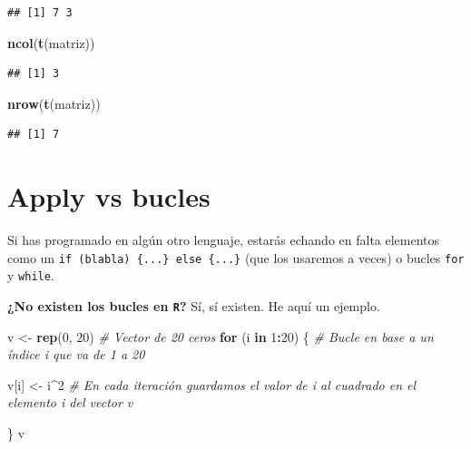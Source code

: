 \documentclass[11pt,]{book}
\newenvironment{Shaded}{\begin{snugshade}}{\end{snugshade}}
\newcommand{\CommentTok}[1]{\textcolor[rgb]{0.37,0.37,0.37}{\textit{#1}}}
\newcommand{\ControlFlowTok}[1]{\textcolor[rgb]{0.27,0.27,0.27}{\textbf{#1}}}
\newcommand{\DecValTok}[1]{\textcolor[rgb]{0.06,0.06,0.06}{#1}}
\newcommand{\KeywordTok}[1]{\textcolor[rgb]{0.27,0.27,0.27}{\textbf{#1}}}
\newcommand{\NormalTok}[1]{#1}
\newcommand{\OperatorTok}[1]{\textcolor[rgb]{0.43,0.43,0.43}{\textbf{#1}}}
\newcommand{\StringTok}[1]{\textcolor[rgb]{0.5,0.5,0.5}{#1}}
\begin{document}
\begin{verbatim}
## [1] 7 3
\end{verbatim}

\begin{Shaded}
\begin{Highlighting}[]
\KeywordTok{ncol}\NormalTok{(}\KeywordTok{t}\NormalTok{(matriz))}
\end{Highlighting}
\end{Shaded}

\begin{verbatim}
## [1] 3
\end{verbatim}

\begin{Shaded}
\begin{Highlighting}[]
\KeywordTok{nrow}\NormalTok{(}\KeywordTok{t}\NormalTok{(matriz))}
\end{Highlighting}
\end{Shaded}

\begin{verbatim}
## [1] 7
\end{verbatim}

\hypertarget{apply-vs-bucles}{%
\section{Apply vs bucles}\label{apply-vs-bucles}}

Si has programado en algún otro lenguaje, estarás echando en falta elementos como un \texttt{if\ (blabla)\ \{...\}\ else\ \{...\}} (que los usaremos a veces) o bucles \texttt{for} y \texttt{while}.

\textbf{¿No existen los bucles en \texttt{R}?} Sí, sí existen. He aquí un ejemplo.

\begin{Shaded}
\begin{Highlighting}[]
\NormalTok{v <-}\StringTok{ }\KeywordTok{rep}\NormalTok{(}\DecValTok{0}\NormalTok{, }\DecValTok{20}\NormalTok{) }\CommentTok{# Vector de 20 ceros}
\ControlFlowTok{for}\NormalTok{ (i }\ControlFlowTok{in} \DecValTok{1}\OperatorTok{:}\DecValTok{20}\NormalTok{) \{ }\CommentTok{# Bucle en base a un índice i que va de 1 a 20}

\NormalTok{  v[i] <-}\StringTok{ }\NormalTok{i}\OperatorTok{^}\DecValTok{2} \CommentTok{# En cada iteración guardamos el valor de i al cuadrado en el elemento i del vector v}
    
\NormalTok{\}}
\NormalTok{v}
\end{Highlighting}
\end{Shaded}
\end{document}
